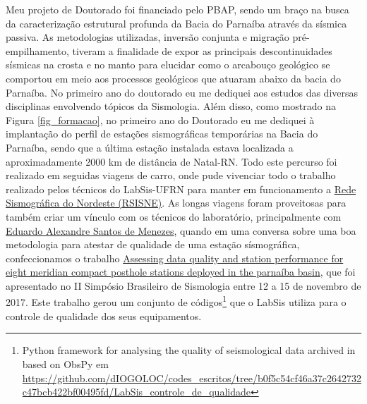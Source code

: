 \documentclass[10pt,a4paper,oneside]{book}
\begin{document}
Meu projeto de Doutorado foi financiado pelo PBAP, sendo um braço na busca da caracterização estrutural profunda da Bacia do Parnaíba através da sísmica passiva. As metodologias utilizadas, inversão conjunta e migração pré-empilhamento, tiveram a finalidade de expor as principais descontinuidades sísmicas na crosta e no manto para elucidar como o arcabouço geológico se comportou em meio aos processos geológicos que atuaram abaixo da bacia do Parnaíba. No primeiro ano do doutorado eu me dediquei aos estudos das diversas disciplinas envolvendo tópicos da Sismologia. Além disso, como mostrado na Figura \ref{fig_formacao}, no primeiro ano do Doutorado eu me dediquei à implantação do perfil de estações sismográficas temporárias na Bacia do Parnaíba, sendo que a última estação instalada estava localizada a aproximadamente 2000 km de distância de Natal-RN. Todo este percurso foi realizado em seguidas viagens de carro, onde pude vivenciar todo o trabalho realizado pelos técnicos do LabSis-UFRN para manter em funcionamento a \href{https://labsis.ufrn.br/}{Rede Sismográfica do Nordeste (RSISNE)}. As longas viagens foram proveitosas para também criar um vínculo com os técnicos do laboratório, principalmente com \href{http://lattes.cnpq.br/0406798380417692}{Eduardo Alexandre Santos de Menezes}, quando em uma conversa sobre uma boa metodologia para atestar de qualidade de uma estação sísmográfica, confeccionamos o trabalho \href{https://dx.doi.org/10.6084/m9.figshare.25367143}{Assessing data quality and station performance for eight meridian compact posthole stations deployed in the parnaíba basin}, que foi apresentado no II Simpósio Brasileiro de Sismologia entre 12 a 15 de novembro de 2017. Este trabalho gerou um conjunto de códigos\footnote{Python framework for analysing the quality of seismological data archived in based on ObsPy em \url{https://github.com/dIOGOLOC/codes_escritos/tree/b0f5c54cf46a37c2642732c47bcb422bf00495fd/LabSis_controle_de_qualidade}} que o LabSis utiliza para o controle de qualidade dos seus equipamentos.  
\end{document}
